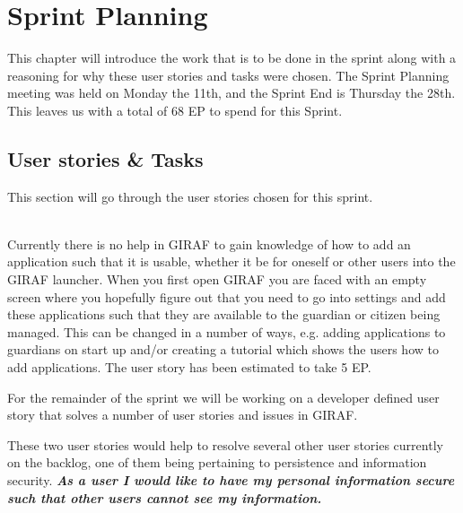 \chapter{Sprint Planning}
This chapter will introduce the work that is to be done in the sprint along with a reasoning for why these user stories and tasks were chosen.
The Sprint Planning meeting was held on Monday the 11th, and the Sprint End is Thursday the 28th.
This leaves us with a total of 68 EP to spend for this Sprint.


\section{User stories \& Tasks}
This section will go through the user stories chosen for this sprint.

\begin{description}[style=unboxed]
    \item[{[}\phigh{]} As a guardian I would like the launcher to tell me how to add applications if none are active, such that it is easier to add applications for beginners.] \hfill \\ 
    Currently there is no help in GIRAF to gain knowledge of how to add an application such that it is usable, whether it be for oneself or other users into the GIRAF launcher.
    When you first open GIRAF you are faced with an empty screen where you hopefully figure out that you need to go into settings and add these applications such that they are available to the guardian or citizen being managed.
    This can be changed in a number of ways, e.g. adding applications to guardians on start up and/or creating a tutorial which shows the users how to add applications.
    The user story has been estimated to take 5 EP.
\end{description}

For the remainder of the sprint we will be working on a developer defined user story that solves a number of user stories and issues in GIRAF. 

These two user stories would help to resolve several other user stories currently on the backlog, one of them being pertaining to persistence and information security.
\textbf{\textit{As a user I would like to have my personal information secure such that other users cannot see my information.}}

